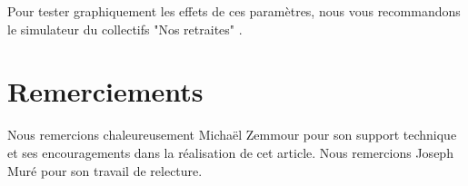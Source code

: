 \documentclass[10pt]{article}
\begin{document}
Pour tester graphiquement les effets de ces paramètres, nous vous recommandons le 
simulateur du collectifs "Nos retraites" \cite{SimulateurNoRetraites}. 


\section{Remerciements}

Nous remercions chaleureusement Michaël Zemmour pour son support 
technique et ses encouragements dans la réalisation de cet article. 
Nous remercions Joseph Muré pour son travail de relecture. 



\end{document}
